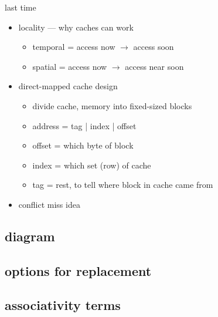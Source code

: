 \date{}
\title{}
\date{}

\begin{frame}
    \titlepage
\end{frame}





\begin{frame}{last time}
    \begin{itemize}
    \item locality --- why caches can work
        \begin{itemize}
        \item temporal = access now $\rightarrow$ access soon
        \item spatial = access now $\rightarrow$ access near soon
        \end{itemize}
    \item direct-mapped cache design
        \begin{itemize}
        \item divide cache, memory into fixed-sized blocks
        \item address = tag | index | offset
        \item offset = which byte of block
        \item index = which set (row) of cache
        \item tag = rest, to tell where block in cache came from
        \end{itemize}
    \item conflict miss idea
    \end{itemize}
\end{frame}

\subsection{diagram}


\subsection{options for replacement}




\subsection{associativity terms}


